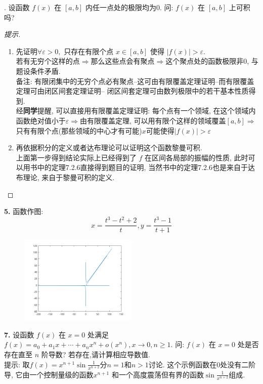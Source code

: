 \documentclass[a4paper,12pt]{article}
\begin{document}
. 设函数 $f(x)$ 在 $[a,b]$ 内任一点处的极限均为0. 问: $f(x)$ 在 $[a,b]$ 上可积吗?\\
\begin{proof}[提示]
\begin{enumerate}
  \item 先证明$\forall \varepsilon>0,$ 只存在有限个点 $x\in[a,b]$ 使得 $|f(x)|>\varepsilon$.\\
    若有无穷个这样的点$\Rightarrow$那么这些点会有聚点$\Rightarrow$这个聚点处的函数极限非0, 与题设条件矛盾.\\
    备注: 有限闭集中的无穷个点必有聚点--这可由有限覆盖定理证明--而有限覆盖定理可由闭区间套定理证明--
    闭区间套定理可由数列极限中的若干基本性质得到.\\
    经\textbf{同学}提醒, 可以直接用有限覆盖定理证明: 每个点有一个领域, 
    在这个领域内函数绝对值小于$\varepsilon\Rightarrow$由有限覆盖定理, 
    可以用有限个这样的领域覆盖$[a,b]$$\Rightarrow$
    只有有限个点(那些领域的中心才有可能)$x$可能使得$|f(x)|>\varepsilon$
  \item 再依据积分的定义或者达布理论可以证明这个函数黎曼可积. \\
    上面第一步得到结论实际上已经得到了 $f$ 在区间各局部的振幅的性质, 
    此时可以用书中的定理7.2.6直接得到题目的证明, 当然书中的定理7.2.6也是来自于达布理论, 
    来自于黎曼可积的定义.
\end{enumerate}
\end{proof}

\noindent \textbf{5.} 函数作图:
\[
x = \frac{t^3-t^2+2}{t}, 
y = \frac{t^3-1}{t+1}
\]
\begin{figure}[htbp]
  \centering
  \includegraphics[width = 0.5\textwidth]{20180228_5.png}
  \caption{}
  \label{}
\end{figure}

\noindent \textbf{7.} 设函数 $f(x)$ 在 $x=0$ 处满足 
$f(x)=a_0+a_1x+\cdots+a_nx^n+o(x^n),x\to 0,n\geq1$. 
问: $f(x)$ 在 $x=0$ 处是否存在直至 $n$ 阶导数? 若存在,请计算相应导数值.\\
提示: 取$f(x)=x^{n+1}\sin\frac{1}{x^{n+2}}$分$n=1$和$n>1$讨论.
这个示例函数在0处没有二阶导, 它由一个控制量级的函数$x^{n+1}$
和一个高度震荡但有界的函数$\sin\frac{1}{x^{n+2}}$组成.
\end{document}
